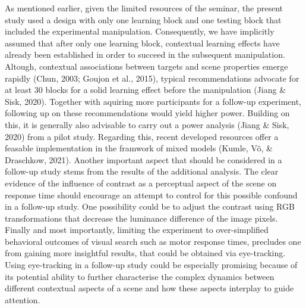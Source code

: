 \documentclass[
  man,floatsintext]{apa7}
\begin{document}
As mentioned earlier, given the limited resources of the seminar, the present study used a design with only one learning block and one testing block that included the experimental manipulation. Consequently, we have implicitly assumed that after only one learning block, contextual learning effects have already been established in order to succeed in the subsequent manipulation. Altough, contextual associations between targets and scene properties emerge rapidly (Chun, 2003; Goujon et al., 2015), typical recommendations advocate for at least 30 blocks for a solid learning effect before the manipulation (Jiang \& Sisk, 2020). Together with aquiring more participants for a follow-up experiment, following up on these recommendations would yield higher power. Building on this, it is generally also advisable to carry out a power analysis (Jiang \& Sisk, 2020) from a pilot study. Regarding this, recent developed resources offer a feasable implementation in the framwork of mixed models (Kumle, Võ, \& Draschkow, 2021). Another important aspect that should be considered in a follow-up study stems from the results of the additional analysis. The clear evidence of the influence of contrast as a perceptual aspect of the scene on response time should encourage an attempt to control for this possible confound in a follow-up study. One possibility could be to adjust the contrast using RGB transformations that decrease the luminance difference of the image pixels. Finally and most importantly, limiting the experiment to over-simplified behavioral outcomes of visual search such as motor response times, precludes one from gaining more insightful results, that could be obtained via eye-tracking. Using eye-tracking in a follow-up study could be especially promising because of its potential ability to further characterise the complex dynamics between different contextual aspects of a scene and how these aspects interplay to guide attention.
\end{document}
